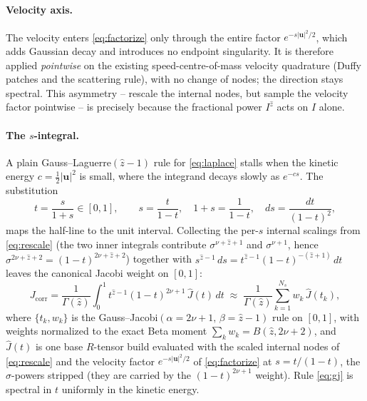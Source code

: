 \documentclass[11pt]{article}
\newcommand{\uu}{\mathbf{u}}
\begin{document}
\paragraph{Velocity axis.}
The velocity enters \eqref{eq:factorize} only through the entire factor $e^{-s|\uu|^2/2}$, which
adds Gaussian decay and introduces no endpoint singularity. It is therefore applied
\emph{pointwise} on the existing speed-centre-of-mass velocity quadrature (Duffy patches and the
scattering rule), with no change of nodes; the direction stays spectral. This asymmetry -- rescale
the internal nodes, but sample the velocity factor pointwise -- is precisely because the fractional
power $I^{\hat z}$ acts on $I$ alone.

\paragraph{The $s$-integral.}
A plain Gauss--Laguerre$(\hat z-1)$ rule for \eqref{eq:laplace} stalls when the kinetic energy
$c=\tfrac12|\uu|^2$ is small, where the integrand decays slowly as $e^{-cs}$. The substitution
\begin{equation}
t=\frac{s}{1+s}\in[0,1],\qquad
s=\frac{t}{1-t},\quad 1+s=\frac{1}{1-t},\quad ds=\frac{dt}{(1-t)^2},
\label{eq:tsub}
\end{equation}
maps the half-line to the unit interval. Collecting the per-$s$ internal scalings from
\eqref{eq:rescale} (the two inner integrals contribute $\sigma^{\nu+\hat z+1}$ and
$\sigma^{\nu+1}$, hence $\sigma^{2\nu+\hat z+2}=(1-t)^{2\nu+\hat z+2}$) together with
$s^{\hat z-1}\,ds=t^{\hat z-1}(1-t)^{-(\hat z+1)}\,dt$ leaves the canonical Jacobi weight on
$[0,1]$:
\begin{equation}
J_{\mathrm{corr}}
=\frac{1}{\Gamma(\hat z)}\int_0^1 t^{\hat z-1}(1-t)^{2\nu+1}\,\widehat J(t)\,dt
\;\approx\;\frac{1}{\Gamma(\hat z)}\sum_{k=1}^{N_s} w_k\,\widehat J(t_k),
\label{eq:gj}
\end{equation}
where $\{t_k,w_k\}$ is the Gauss--Jacobi$(\alpha{=}2\nu+1,\,\beta{=}\hat z-1)$ rule on $[0,1]$,
with weights normalized to the exact Beta moment $\sum_k w_k=B(\hat z,2\nu+2)$, and $\widehat J(t)$
is one base $R$-tensor build evaluated with the scaled internal nodes of \eqref{eq:rescale} and the
velocity factor $e^{-s|\uu|^2/2}$ of \eqref{eq:factorize} at $s=t/(1-t)$, the $\sigma$-powers
stripped (they are carried by the $(1-t)^{2\nu+1}$ weight). Rule \eqref{eq:gj} is spectral in $t$
uniformly in the kinetic energy.
\end{document}
